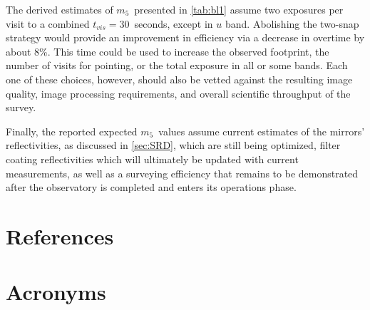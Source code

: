 \documentclass[PST,authoryear,toc]{lsstdoc}
\newcommand{\mf}{\ensuremath{m_5}}
\begin{document}
 
The derived estimates of \mf\ presented in \autoref{tab:bl1} assume two exposures per visit to a combined $t_{vis}=30$~seconds, except in $u$ band. Abolishing the two-snap strategy would provide an improvement in efficiency via a decrease in overtime by about 8\%. This time could be used to increase the observed footprint, the number of visits for pointing, or the total exposure in all or some bands. Each one of these choices, however, should also be vetted against the resulting image quality, image processing requirements, and overall scientific throughput of the survey. 
 
Finally, the reported expected \mf\ values assume current estimates of the mirrors' reflectivities, as discussed in \autoref{sec:SRD}, which are still being optimized, filter coating reflectivities which will ultimately be updated with current measurements, as well as a surveying efficiency that remains to be demonstrated after the observatory is completed and enters its operations phase. 


\appendix
\section{References} \label{sec:bib}
\renewcommand{\refname}{} %


\section{Acronyms} \label{sec:acronyms}

\end{document}
